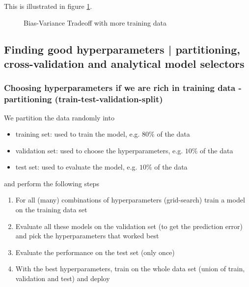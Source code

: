 This is illustrated in figure \ref{fig:bias_variance_tradeoffB}.

\begin{figure}[!htb]
    \centering
    
    \caption{Bias-Variance Tradeoff with more training data}
    \label{fig:bias_variance_tradeoffB}
\end{figure}

\subsection{Finding good hyperparameters | partitioning, cross-validation and analytical
model selectors}
\subsubsection{Choosing hyperparameters if we are rich in training data - partitioning (train-test-validation-split)}
We partition the data randomly into
\begin{itemize}
    \item \textcolor{blue1}{training set}: used to train the model, e.g. $80\%$ of the data
    \item \textcolor{blue1}{validation set}: used to choose the hyperparameters, e.g. $10\%$ of the data
    \item \textcolor{blue1}{test set}: used to evaluate the model, e.g. $10\%$ of the data
\end{itemize}
and perform the following steps
\begin{enumerate}
    \item For all (many) combinations of hyperparameters (grid-search) train a model on the training data set
    \item Evaluate all these models on the validation set (to get the prediction error) and pick the hyperparameters that worked best
    \item Evaluate the performance on the test set (only once)
    \item With the best hyperparameters, train on the whole data set (union of train, validation and test) and deploy
\end{enumerate}



